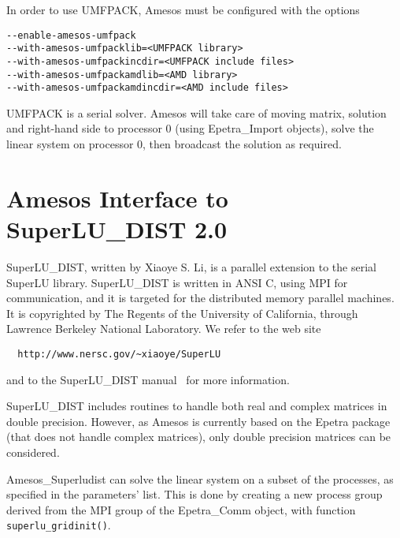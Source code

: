 \documentclass[11pt]{SANDreport}
\begin{document}
In order to use UMFPACK, Amesos must be configured with the options
\begin{verbatim}
--enable-amesos-umfpack 
--with-amesos-umfpacklib=<UMFPACK library> 
--with-amesos-umfpackincdir=<UMFPACK include files>
--with-amesos-umfpackamdlib=<AMD library>
--with-amesos-umfpackamdincdir=<AMD include files>
\end{verbatim}

UMFPACK is a serial solver. Amesos will take care of moving matrix,
solution and right-hand side to processor 0 (using Epetra\_Import
objects), solve the linear system on processor 0, then broadcast the
solution as required.




\section{Amesos Interface to SuperLU\_DIST 2.0}
\label{sec:superludist}

SuperLU\_DIST, written by Xiaoye S. Li, is a parallel extension to the
serial SuperLU library.  SuperLU\_DIST is written in ANSI C, using MPI
for communication, and it is targeted for the distributed memory
parallel machines. It is copyrighted by The Regents of the University of
California, through Lawrence Berkeley National Laboratory.  We refer to
the web site
\begin{verbatim}
  http://www.nersc.gov/~xiaoye/SuperLU
\end{verbatim}
and to the SuperLU\_DIST manual~\cite{superlu-manual} for more
information.

SuperLU\_DIST includes routines to handle both real and complex matrices
in double precision. However, as Amesos is currently based on the Epetra
package (that does not handle complex matrices), only double precision
matrices can be considered.

Amesos\_Superludist can solve the linear system on a subset of the
processes, as specified in the parameters' list. This is done by
creating a new process group derived from the MPI group of the
Epetra\_Comm object, with function \verb!superlu_gridinit()!. 

\medskip
\end{document}

